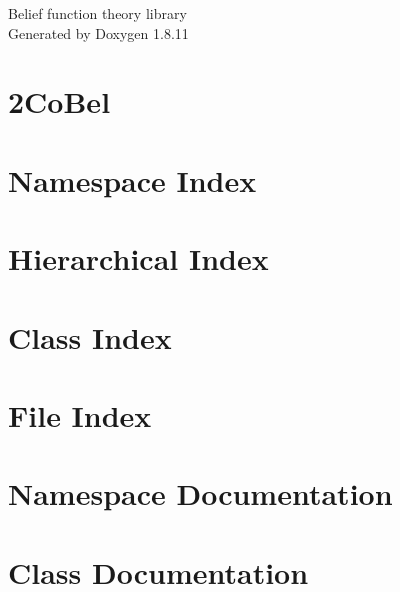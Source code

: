 \documentclass[twoside]{book}
\newcommand{\+}{\discretionary{\mbox{\scriptsize$\hookleftarrow$}}{}{}}
\newcommand{\clearemptydoublepage}{%
  \newpage{\pagestyle{empty}\cleardoublepage}%
}
\begin{document}
\hypersetup{pageanchor=false,
             bookmarksnumbered=true,
             pdfencoding=unicode
            }
\begin{titlepage}
\vspace*{7cm}
\begin{center}%
{\Large Belief function theory library }\\
\vspace*{1cm}
{\large Generated by Doxygen 1.8.11}\\
\end{center}
\end{titlepage}
\clearemptydoublepage
\tableofcontents
\clearemptydoublepage
{}
\hypersetup{pageanchor=true}

\chapter{2\+Co\+Bel}
\label{md_README}
\hypertarget{md_README}{}

\chapter{Namespace Index}

\chapter{Hierarchical Index}

\chapter{Class Index}

\chapter{File Index}

\chapter{Namespace Documentation}




\chapter{Class Documentation}
























\end{document}
